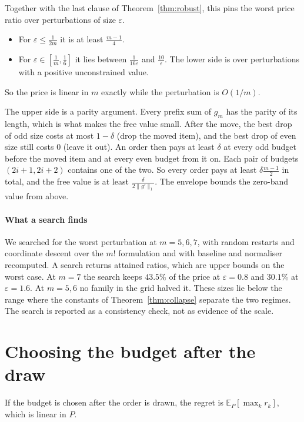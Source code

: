 
Together with the last clause of Theorem~\ref{thm:robust}, this pins the worst price ratio
over perturbations of size $\varepsilon$.
\begin{itemize}
\item For $\varepsilon\le\frac{1}{2m}$ it is at least $\frac{m-1}{4}$.
\item For $\varepsilon\in[\frac1m,\frac16]$ it lies between $\frac{1}{16\varepsilon}$ and
$\frac{10}{\varepsilon}$. The lower side is over perturbations with a positive unconstrained
value.
\end{itemize}
So the price is linear in $m$ exactly while the perturbation is $O(1/m)$.

The upper side is a parity argument. Every prefix sum of $g_{m}$ has the parity of its
length, which is what makes the free value small. After the move, the best drop of odd size
costs at most $1-\delta$ (drop the moved item), and the best drop of even size still costs
$0$ (leave it out). An order then pays at least $\delta$ at every odd budget before the moved
item and at every even budget from it on. Each pair of budgets $(2i+1,2i+2)$ contains one of
the two. So every order pays at least $\delta\frac{m-1}{2}$ in total, and the free value is at
least $\frac{\delta}{2\|g'\|_{1}}$. The envelope bounds the zero-band value from above.

\paragraph{What a search finds}
We searched for the worst perturbation at $m=5,6,7$, with random restarts and coordinate
descent over the $m!$ formulation and with baseline and normaliser recomputed. A search returns
attained ratios, which are upper bounds on the worst case. At $m=7$ the search keeps $43.5\%$
of the price at $\varepsilon=0.8$ and $30.1\%$ at $\varepsilon=1.6$. At $m=5,6$ no family in
the grid halved it. \NUM{} These sizes lie below the range where the constants of
Theorem~\ref{thm:collapse} separate the two regimes. The search is reported as a consistency
check, not as evidence of the scale.

\section{Choosing the budget after the draw}
\label{sec:expost}

If the budget is chosen after the order is drawn, the regret is
$\mathbb{E}_{P}[\max_{k}r_{k}]$, which is linear in $P$.

